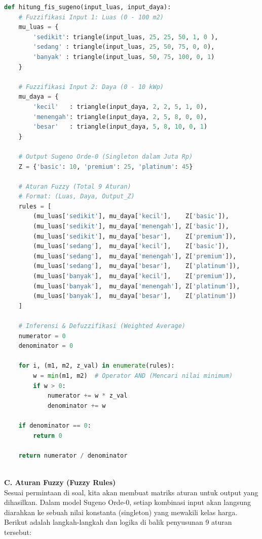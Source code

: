 \documentclass{article}
\begin{document}
\begin{lstlisting}[caption=Menghitung FIS Sugeno, language=Python]
def hitung_fis_sugeno(input_luas, input_daya):
    # Fuzzifikasi Input 1: Luas (0 - 100 m2)
    mu_luas = {
        'sedikit': triangle(input_luas, 25, 25, 50, 1, 0 ),
        'sedang' : triangle(input_luas, 25, 50, 75, 0, 0),
        'banyak' : triangle(input_luas, 50, 75, 100, 0, 1)
    }

    # Fuzzifikasi Input 2: Daya (0 - 10 kWp)
    mu_daya = {
        'kecil'   : triangle(input_daya, 2, 2, 5, 1, 0),
        'menengah': triangle(input_daya, 2, 5, 8, 0, 0),
        'besar'   : triangle(input_daya, 5, 8, 10, 0, 1)    
    }

    # Output Sugeno Orde-0 (Singleton dalam Juta Rp)
    Z = {'basic': 10, 'premium': 25, 'platinum': 45}

    # Aturan Fuzzy (Total 9 Aturan)
    # Format: (Luas, Daya, Output_Z)
    rules = [
        (mu_luas['sedikit'], mu_daya['kecil'],    Z['basic']),
        (mu_luas['sedikit'], mu_daya['menengah'], Z['basic']),
        (mu_luas['sedikit'], mu_daya['besar'],    Z['premium']),
        (mu_luas['sedang'],  mu_daya['kecil'],    Z['basic']),
        (mu_luas['sedang'],  mu_daya['menengah'], Z['premium']),
        (mu_luas['sedang'],  mu_daya['besar'],    Z['platinum']),
        (mu_luas['banyak'],  mu_daya['kecil'],    Z['premium']),
        (mu_luas['banyak'],  mu_daya['menengah'], Z['platinum']),
        (mu_luas['banyak'],  mu_daya['besar'],    Z['platinum'])
    ]

    # Inferensi & Defuzzifikasi (Weighted Average)
    numerator = 0
    denominator = 0

    for i, (m1, m2, z_val) in enumerate(rules):
        w = min(m1, m2)  # Operator AND (Mencari nilai minimum)
        if w > 0:
            numerator += w * z_val
            denominator += w

    if denominator == 0:
        return 0

    return numerator / denominator
\end{lstlisting} \\

\textbf{C. Aturan Fuzzy (Fuzzy Rules)}\\
Sesuai permintaan di soal, kita akan membuat matriks aturan untuk output yang dihasilkan. Dalam model Sugeno Orde-0, setiap kombinasi input akan langsung diarahkan ke sebuah nilai konstanta (singleton) yang mewakili kelas harga. Berikut adalah langkah-langkah dan logika di balik penyusunan 9 aturan tersebut:
\end{document}
